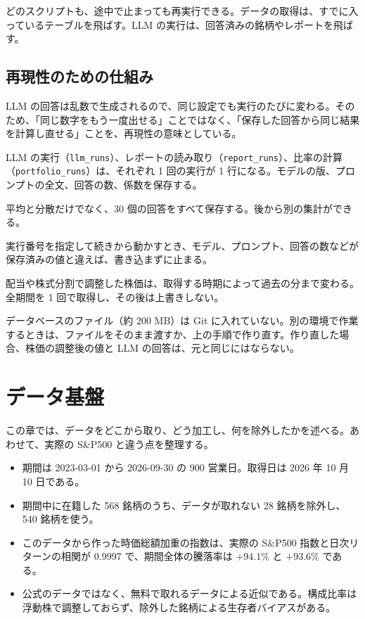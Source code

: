 \documentclass[xelatex,ja=standard,jafont=hiragino-pron,a4paper,10pt]{bxjsreport}
\newcommand{\SP}{S\&P500}
\newcommand{\code}[1]{\texttt{#1}}
\begin{document}
どのスクリプトも、途中で止まっても再実行できる。データの取得は、すでに入っているテーブルを飛ばす。LLM の実行は、回答済みの銘柄やレポートを飛ばす。

\section{再現性のための仕組み}

LLM の回答は乱数で生成されるので、同じ設定でも実行のたびに変わる。そのため、「同じ数字をもう一度出せる」ことではなく、「保存した回答から同じ結果を計算し直せる」ことを、再現性の意味としている。

\begin{description}[leftmargin=2em,style=nextline,itemsep=0.4em]
\item[実行ごとに条件を残す] LLM の実行（\code{llm\_runs}）、レポートの読み取り（\code{report\_runs}）、比率の計算（\code{portfolio\_runs}）は、それぞれ 1 回の実行が 1 行になる。モデルの版、プロンプトの全文、回答の数、係数を保存する。
\item[結果を加工せずに残す] 平均と分散だけでなく、30 個の回答をすべて保存する。後から別の集計ができる。
\item[違う設定を混ぜない] 実行番号を指定して続きから動かすとき、モデル、プロンプト、回答の数などが保存済みの値と違えば、書き込まずに止まる。
\item[データは 1 回取って固定する] 配当や株式分割で調整した株価は、取得する時期によって過去の分まで変わる。全期間を 1 回で取得し、その後は上書きしない。
\end{description}

データベースのファイル（約 200 MB）は Git に入れていない。別の環境で作業するときは、ファイルをそのまま渡すか、上の手順で作り直す。作り直した場合、株価の調整後の値と LLM の回答は、元と同じにはならない。

\chapter{データ基盤}\label{ch:data}

この章では、データをどこから取り、どう加工し、何を除外したかを述べる。あわせて、実際の \SP{} と違う点を整理する。

\begin{keybox}
\begin{itemize}
\item 期間は 2023-03-01 から 2026-09-30 の 900 営業日。取得日は 2026 年 10 月 10 日である。
\item 期間中に在籍した 568 銘柄のうち、データが取れない 28 銘柄を除外し、540 銘柄を使う。
\item このデータから作った時価総額加重の指数は、実際の \SP{} 指数と日次リターンの相関が 0.9997 で、期間全体の騰落率は $+94.1\%$ と $+93.6\%$ である。
\item 公式のデータではなく、無料で取れるデータによる近似である。構成比率は浮動株で調整しておらず、除外した銘柄による生存者バイアスがある。
\end{itemize}
\end{keybox}
\end{document}
